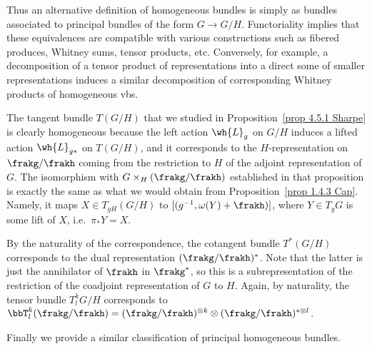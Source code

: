 Thus an alternative definition of homogeneous bundles is simply as bundles associated to principal bundles of the form $G\to G\slash H$. Functoriality implies that these equivalences are compatible with various constructions such as fibered produces, Whitney sums, tensor products, etc. Conversely, for example, a decomposition of a tensor product of representations into a direct some of smaller representations induces a similar decomposition of corresponding Whitney products of homogeneous \glspl{vb}.

\begin{example}\label{ex 1.4.3 Cap}
    The  tangent  bundle $T(G\slash H)$ that we studied in Proposition~\ref{prop 4.5.1 Sharpe} is clearly homogeneous because the left action $\wh{L}_g$ on $G\slash H$ induces a lifted action $\wh{L}_{g\ast}$ on $T(G\slash H)$, and it corresponds to the $H$-representation on $\frakg\slash \frakh$ coming from the restriction to $H$ of the adjoint representation of $G$. The isomorphism with $G\times_H (\frakg\slash\frakh)$ established in that proposition is exactly the same as what we would obtain from Proposition~\ref{prop 1.4.3 Cap}. Namely, it maps $X\in T_{gH}(G\slash H)$ to $[(g^{-1},\omega(Y)+\frakh)]$, where $Y\in T_g G$ is some lift of $X$, i.e.\ $\pi_\ast Y=X$.

    By the naturality of the correspondence, the cotangent bundle $T^\ast(G\slash H)$ corresponds to the dual representation $(\frakg\slash\frakh)^\ast$. Note that the latter is just the annihilator of $\frakh$ in $\frakg^\ast$, so this is a subrepresentation of the restriction of the coadjoint representation of $G$ to $H$. Again, by naturality, the tensor bundle $T^k_l G\slash H$ corresponds to $\bbT^k_l(\frakg\slash\frakh)=(\frakg\slash\frakh)^{\otimes k}\otimes (\frakg\slash\frakh)^{\ast\otimes l}$.
\end{example}



Finally we provide a similar classification of principal homogeneous bundles.

